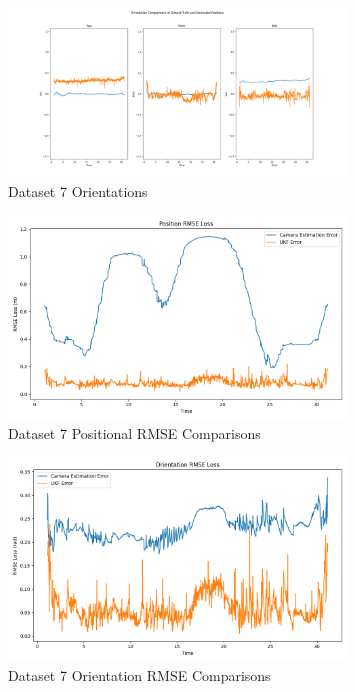 \documentclass{article}
\begin{document}
\begin{figure}[H]
    \centering
    \includegraphics[width=0.8\textwidth]{./imgs/task4/studentdata7_ukf_orientations.png}
    \caption{Dataset 7 Orientations}
\end{figure}

\begin{figure}[H]
    \centering
    \includegraphics[width=0.8\textwidth]{./imgs/task4/studentdata7_ukf_position_rmse.png}
    \caption{Dataset 7 Positional RMSE Comparisons}
\end{figure}

\begin{figure}[H]
    \centering
    \includegraphics[width=0.8\textwidth]{./imgs/task4/studentdata7_ukf_orientation_rmse.png}
    \caption{Dataset 7 Orientation RMSE Comparisons}
\end{figure}
\end{document}
